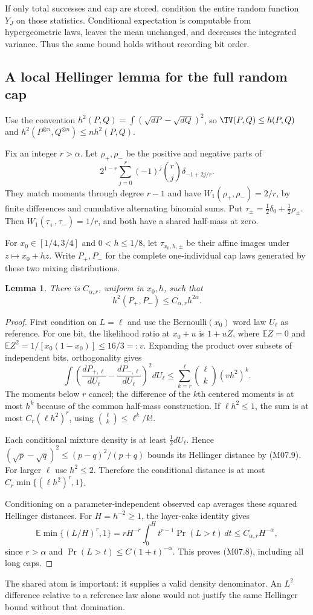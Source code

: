 \documentclass[11pt,a4paper]{article}
\newtheorem{lemma}[theorem]{Lemma}
\theoremstyle{definition}\newtheorem{definition}[theorem]{Definition}
\theoremstyle{remark}\newtheorem{remark}[theorem]{Remark}
\newcommand{\E}{\mathbb E}\newcommand{\one}{\mathbf 1}\newcommand{\1}{\mathbf 1}
\numberwithin{equation}{section}
\begin{document}
If only total successes and cap are stored, condition the entire random function $Y_J$ on those statistics. Conditional expectation is computable from hypergeometric laws, leaves the mean unchanged, and decreases the integrated variance. Thus the same bound holds without recording bit order.

\subsection{A local Hellinger lemma for the full random cap}\label{M07-sec-3}
Use the convention $h^2(P,Q)=\int(\sqrt{dP}-\sqrt{dQ})^2$, so $\TV(P,Q)\le h(P,Q)$ and $h^2(P^{\otimes n},Q^{\otimes n})\le n h^2(P,Q)$.

Fix an integer $r>\alpha$. Let $\rho_+,\rho_-$ be the positive and negative parts of
\[
 2^{1-r}\sum_{j=0}^r(-1)^j\binom{r}{j}\delta_{-1+2j/r}.
\]
They match moments through degree $r-1$ and have $W_1(\rho_+,\rho_-)=2/r$, by finite differences and cumulative alternating binomial sums. Put
$\tau_\pm=\tfrac12\delta_0+\tfrac12\rho_\pm$.
Then $W_1(\tau_+,\tau_-)=1/r$, and both have a shared half-mass at zero.

For $x_0\in[1/4,3/4]$ and $0<h\le1/8$, let $\tau_{x_0,h,\pm}$ be their affine images under $z\mapsto x_0+hz$. Write $P_+,P_-$ for the complete one-individual cap laws generated by these two mixing distributions.
\begin{lemma}\label{M07-lem:hell}
There is $C_{\alpha,r}$, uniform in $x_0,h$, such that
\[
 h^2(P_+,P_-)\le C_{\alpha,r}h^{2\alpha}.
\tag{M07.8}
\]
\end{lemma}
\begin{proof}
First condition on $L=\ell$ and use the Bernoulli$(x_0)$ word law $U_\ell$ as reference. For one bit, the likelihood ratio at $x_0+u$ is $1+uZ$, where $\E Z=0$ and $\E Z^2=1/[x_0(1-x_0)]\le16/3=:v$. Expanding the product over subsets of independent bits, orthogonality gives
\[
 \int\left(\frac{dP_{+,\ell}}{dU_\ell}-\frac{dP_{-,\ell}}{dU_\ell}\right)^2dU_\ell
 \le\sum_{k=r}^{\ell}\binom{\ell}{k}(v h^2)^k.
\tag{M07.9}
\]
The moments below $r$ cancel; the difference of the $k$th centered moments is at most $h^k$ because of the common half-mass construction. If $\ell h^2\le1$, the sum is at most $C_r(\ell h^2)^r$, using $\binom{\ell}{k}\le\ell^k/k!$.

Each conditional mixture density is at least $\frac12dU_\ell$. Hence
$(\sqrt p-\sqrt q)^2\le(p-q)^2/(p+q)$ bounds its Hellinger distance by (M07.9). For larger $\ell$ use $h^2\le2$. Therefore the conditional distance is at most $C_r\min\{(\ell h^2)^r,1\}$.

Conditioning on a parameter-independent observed cap averages these squared Hellinger distances. For $H=h^{-2}\ge1$, the layer-cake identity gives
\[
 \E\min\{(L/H)^r,1\}
 =rH^{-r}\int_0^H t^{r-1}\Pr(L>t)\,dt
 \le C_{\alpha,r}H^{-\alpha},
\]
since $r>\alpha$ and $\Pr(L>t)\le C(1+t)^{-\alpha}$. This proves (M07.8), including all long caps.
\end{proof}
The shared atom is important: it supplies a valid density denominator. An $L^2$ difference relative to a reference law alone would not justify the same Hellinger bound without that domination.
\end{document}
